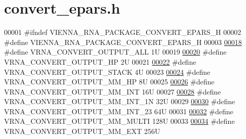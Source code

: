 \hypertarget{convert__epars_8h_source}{}\section{convert\+\_\+epars.\+h}
\label{convert__epars_8h_source}

\begin{DoxyCode}
00001 \textcolor{preprocessor}{#ifndef VIENNA\_RNA\_PACKAGE\_CONVERT\_EPARS\_H}
00002 \textcolor{preprocessor}{#define VIENNA\_RNA\_PACKAGE\_CONVERT\_EPARS\_H}
00003 
\hypertarget{convert__epars_8h_source.tex_l00018}{}\hyperlink{group__energy__parameters__convert_ga8dc6aee5a806c49b71557152f9616bc4}{00018} \textcolor{preprocessor}{#define VRNA\_CONVERT\_OUTPUT\_ALL           1U}
00019 
\hypertarget{convert__epars_8h_source.tex_l00020}{}\hyperlink{group__energy__parameters__convert_gaf66fe2cb11dfcfd32d791049c254a8a4}{00020} \textcolor{preprocessor}{#define VRNA\_CONVERT\_OUTPUT\_HP            2U}
00021 
\hypertarget{convert__epars_8h_source.tex_l00022}{}\hyperlink{group__energy__parameters__convert_gad23522d63f8d4c50d5a5deee9bee3ef2}{00022} \textcolor{preprocessor}{#define VRNA\_CONVERT\_OUTPUT\_STACK         4U}
00023 
\hypertarget{convert__epars_8h_source.tex_l00024}{}\hyperlink{group__energy__parameters__convert_gaa892c7b4957459090f3e08da298cc347}{00024} \textcolor{preprocessor}{#define VRNA\_CONVERT\_OUTPUT\_MM\_HP         8U}
00025 
\hypertarget{convert__epars_8h_source.tex_l00026}{}\hyperlink{group__energy__parameters__convert_ga4ff223fb1f9c62cd92d9ab811ad03d55}{00026} \textcolor{preprocessor}{#define VRNA\_CONVERT\_OUTPUT\_MM\_INT        16U}
00027 
\hypertarget{convert__epars_8h_source.tex_l00028}{}\hyperlink{group__energy__parameters__convert_gaf5d3743219f83c6348155cd81e755bbb}{00028} \textcolor{preprocessor}{#define VRNA\_CONVERT\_OUTPUT\_MM\_INT\_1N     32U}
00029 
\hypertarget{convert__epars_8h_source.tex_l00030}{}\hyperlink{group__energy__parameters__convert_ga78382ec622ba99e0ac2262317bdd7316}{00030} \textcolor{preprocessor}{#define VRNA\_CONVERT\_OUTPUT\_MM\_INT\_23     64U}
00031 
\hypertarget{convert__epars_8h_source.tex_l00032}{}\hyperlink{group__energy__parameters__convert_gae67af9f1cdf7baf2865481282a5d1034}{00032} \textcolor{preprocessor}{#define VRNA\_CONVERT\_OUTPUT\_MM\_MULTI      128U}
00033 
\hypertarget{convert__epars_8h_source.tex_l00034}{}\hyperlink{group__energy__parameters__convert_gaf14ead7ef1fdbe725ade653750fc51e3}{00034} \textcolor{preprocessor}{#define VRNA\_CONVERT\_OUTPUT\_MM\_EXT        256U}

\end{DoxyCode}
